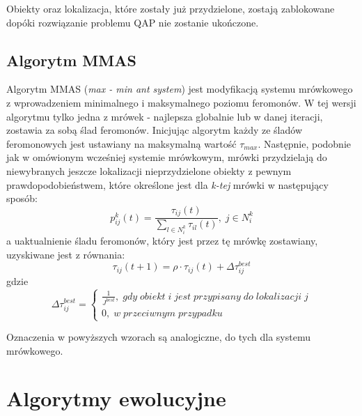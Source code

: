 Obiekty oraz lokalizacja, które zostały już przydzielone, zostają zablokowane dopóki rozwiązanie problemu QAP nie zostanie ukończone.

\subsection{Algorytm MMAS}
Algorytm MMAS (\textit{max - min ant system}) jest modyfikacją systemu mrówkowego z wprowadzeniem minimalnego i maksymalnego poziomu feromonów. W tej wersji algorytmu tylko jedna z mrówek - najlepsza globalnie lub w danej iteracji, zostawia za sobą ślad feromonów. Inicjując algorytm każdy ze śladów feromonowych jest ustawiany na maksymalną wartość $\tau_{max}$. Następnie, podobnie jak w omówionym wcześniej systemie mrówkowym, mrówki przydzielają do niewybranych jeszcze lokalizacji nieprzydzielone obiekty z pewnym prawdopodobieństwem, które określone jest dla \textit{k-tej} mrówki w następujący sposób:
\newline
\begin{equation}
p_{ij}^k(t)=\frac{\tau_{ij}(t)}{\sum\limits_{l\in N_i^k} \tau_{il}(t)}, \; j \in N_i^k
\end{equation}
\newline
a uaktualnienie śladu feromonów, który jest przez tę mrówkę zostawiany, uzyskiwane jest z równania:
\newline
\begin{equation}
\tau_{ij}(t+1)=\rho \cdot \tau_{ij}(t)+\Delta \tau_{ij}^{best}
\end{equation}
\newline
gdzie
\newline
\begin{equation}
\Delta \tau_{ij}^{best} = \left\{ \begin{array}{ccc} \frac{1}{J^{best}}, \; gdy \; obiekt \; i \; jest \; przypisany \; do \; lokalizacji \; j \\ 0, \; w \; przeciwnym \;  przypadku \end{array} \right.
\end{equation}
\newline

Oznaczenia w powyższych wzorach są analogiczne, do tych dla systemu mrówkowego.
\section{Algorytmy ewolucyjne}
\label{sec:AE}

